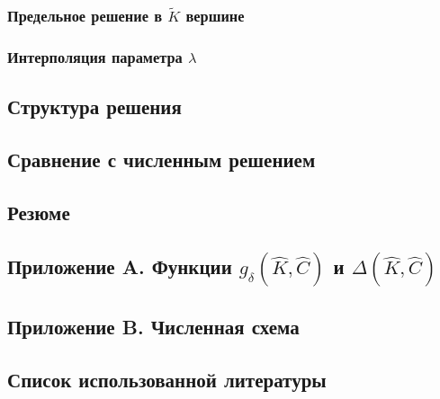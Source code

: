 \documentclass[main.tex]{subfiles}
\begin{document}
\subsubsection{Предельное решение в $\tilde{K}$ вершине}

\subsubsection{Интерполяция параметра $\lambda$}

\subsection{Структура решения}

\subsection{Сравнение с численным решением}

\subsection{Резюме}

\subsection*{Приложение A. Функции $g_{\delta}\!\left(\hat{K},\hat{C}\right)$ и $\Delta\!\left(\hat{K},\hat{C}\right)$}


\subsection*{Приложение B. Численная схема}


\subsection*{Список использованной литературы}


\newpage
\setcounter{figure}{0}
\setcounter{subsection}{0}
\setcounter{equation}{0}
\end{document}
